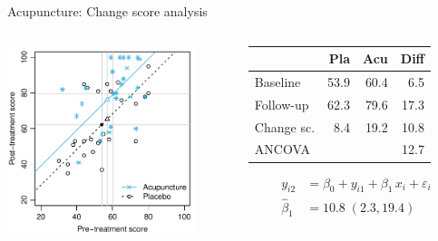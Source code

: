 \documentclass[aspectratio=169]{beamer}
\begin{document}
\begin{frame}{Acupuncture: Change score analysis}
\begin{columns}[T]
\begin{column}{5.5cm}
  \includegraphics[width=5.5cm]{../figures/acu-chng}
\end{column}
%
\begin{column}{5.5cm}
  \vspace*{1em}\small
  \begin{tabular}{lrrr}
  \hline
             &  Pla &  Acu & Diff \\ \hline
  Baseline   & 53.9 & 60.4 &  6.5 \\
  Follow-up  & 62.3 & 79.6 & 17.3 \\
  Change sc. &  8.4 & 19.2 & 10.8 \\
  ANCOVA     &      &      & 12.7 \\ \hline
  \end{tabular}
\begin{align*}
         y_{i2} &= \beta_0 + y_{i1} + \beta_1 \, x_i + \varepsilon_i \\
  \hat{\beta}_1 &= 10.8 \; (2.3, 19.4)
\end{align*}
\end{column}
\end{columns}
\end{frame}
\end{document}
